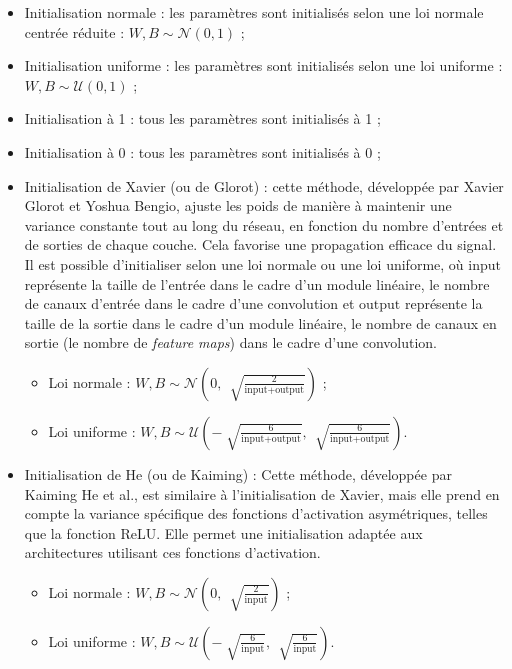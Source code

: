 \documentclass{article}
\begin{document}
\begin{itemize}
    \item Initialisation normale : les paramètres sont initialisés selon une loi normale centrée réduite : $ W, B \sim \mathcal{N}(0, 1) $ ;
    \item Initialisation uniforme : les paramètres sont initialisés selon une loi uniforme : $ W, B \sim \mathcal{U}(0, 1) $ ;
    \item Initialisation à 1 : tous les paramètres sont initialisés à 1 ;
    \item Initialisation à 0 : tous les paramètres sont initialisés à 0 ;
    \item Initialisation de Xavier (ou de Glorot) : cette méthode, développée par Xavier Glorot et Yoshua Bengio, ajuste les poids de manière à maintenir une variance constante tout au long du réseau, en fonction du nombre d'entrées et de sorties de chaque couche. Cela favorise une propagation efficace du signal. Il est possible d'initialiser selon une loi normale ou une loi uniforme, où $ \text{input} $ représente la taille de l'entrée dans le cadre d'un module linéaire, le nombre de canaux d'entrée dans le cadre d'une convolution et $ \text{output} $ représente la taille de la sortie dans le cadre d'un module linéaire, le nombre de canaux en sortie (le nombre de \textit{feature maps}) dans le cadre d'une convolution.
    \begin{itemize}
        \item Loi normale : $ W, B \sim \mathcal{N}(0, \, \sqrt[]{\frac{2}{\text{input} + \text{output}}}) $ ;
        \item Loi uniforme : $ W, B \sim \mathcal{U}(- \sqrt[]{\frac{6}{\text{input} + \text{output}}}, \, \sqrt[]{\frac{6}{\text{input} + \text{output}}}) $.
    \end{itemize}
    \item Initialisation de He (ou de Kaiming) : Cette méthode, développée par Kaiming He et al., est similaire à l'initialisation de Xavier, mais elle prend en compte la variance spécifique des fonctions d'activation asymétriques, telles que la fonction ReLU. Elle permet une initialisation adaptée aux architectures utilisant ces fonctions d'activation. 
    \begin{itemize}
        \item Loi normale : $ W, B \sim \mathcal{N}(0, \, \sqrt[]{\frac{2}{\text{input}}}) $ ;
        \item Loi uniforme : $ W, B \sim \mathcal{U}(- \sqrt[]{\frac{6}{\text{input}}}, \, \sqrt[]{\frac{6}{\text{input}}}) $.
    \end{itemize}
\end{itemize}
\end{document}
